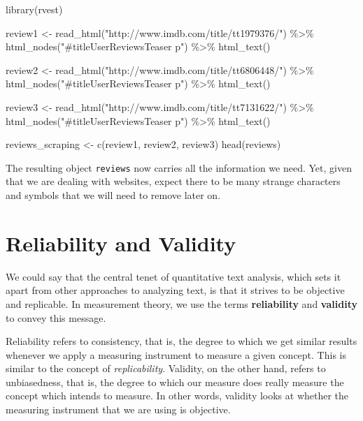 \documentclass[
]{article}
\newenvironment{Shaded}{\begin{snugshade}}{\end{snugshade}}
\newcommand{\FunctionTok}[1]{\textcolor[rgb]{0.00,0.00,0.00}{#1}}
\newcommand{\NormalTok}[1]{#1}
\newcommand{\OtherTok}[1]{\textcolor[rgb]{0.56,0.35,0.01}{#1}}
\newcommand{\SpecialCharTok}[1]{\textcolor[rgb]{0.00,0.00,0.00}{#1}}
\newcommand{\StringTok}[1]{\textcolor[rgb]{0.31,0.60,0.02}{#1}}
\begin{document}
\begin{Shaded}
\begin{Highlighting}[]
\FunctionTok{library}\NormalTok{(rvest)}

\NormalTok{review1 }\OtherTok{\textless{}{-}} \FunctionTok{read\_html}\NormalTok{(}\StringTok{"http://www.imdb.com/title/tt1979376/"}\NormalTok{) }\SpecialCharTok{\%\textgreater{}\%}
 \FunctionTok{html\_nodes}\NormalTok{(}\StringTok{"\#titleUserReviewsTeaser p"}\NormalTok{) }\SpecialCharTok{\%\textgreater{}\%}
 \FunctionTok{html\_text}\NormalTok{()}

\NormalTok{review2 }\OtherTok{\textless{}{-}} \FunctionTok{read\_html}\NormalTok{(}\StringTok{"http://www.imdb.com/title/tt6806448/"}\NormalTok{) }\SpecialCharTok{\%\textgreater{}\%}
 \FunctionTok{html\_nodes}\NormalTok{(}\StringTok{"\#titleUserReviewsTeaser p"}\NormalTok{) }\SpecialCharTok{\%\textgreater{}\%}
 \FunctionTok{html\_text}\NormalTok{()}

\NormalTok{review3 }\OtherTok{\textless{}{-}} \FunctionTok{read\_html}\NormalTok{(}\StringTok{"http://www.imdb.com/title/tt7131622/"}\NormalTok{) }\SpecialCharTok{\%\textgreater{}\%}
 \FunctionTok{html\_nodes}\NormalTok{(}\StringTok{"\#titleUserReviewsTeaser p"}\NormalTok{) }\SpecialCharTok{\%\textgreater{}\%}
 \FunctionTok{html\_text}\NormalTok{()}

\NormalTok{reviews\_scraping }\OtherTok{\textless{}{-}} \FunctionTok{c}\NormalTok{(review1, review2, review3)}
\FunctionTok{head}\NormalTok{(reviews)}
\end{Highlighting}
\end{Shaded}

The resulting object \texttt{reviews} now carries all the information we need. Yet, given that we are dealing with websites, expect there to be many strange characters and symbols that we will need to remove later on.

\hypertarget{reliability-and-validity}{%
\section{Reliability and Validity}\label{reliability-and-validity}}

We could say that the central tenet of quantitative text analysis, which sets it apart from other approaches to analyzing text, is that it strives to be objective and replicable. In measurement theory, we use the terms \textbf{reliability} and \textbf{validity} to convey this message.

Reliability refers to consistency, that is, the degree to which we get similar results whenever we apply a measuring instrument to measure a given concept. This is similar to the concept of \emph{replicability}. Validity, on the other hand, refers to unbiasedness, that is, the degree to which our measure does really measure the concept which intends to measure. In other words, validity looks at whether the measuring instrument that we are using is objective.
\end{document}
